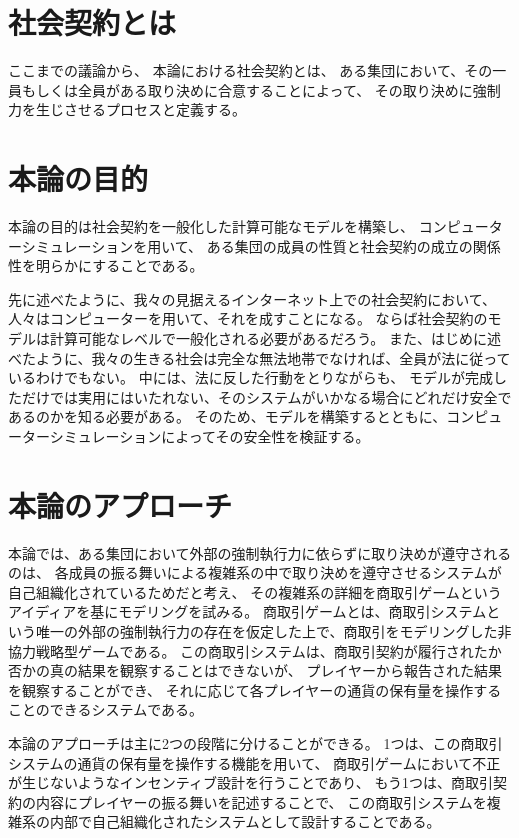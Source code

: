   \section{社会契約とは}
  ここまでの議論から、
  本論における社会契約とは、
  ある集団において、その一員もしくは全員がある取り決めに合意することによって、
  その取り決めに強制力を生じさせるプロセスと定義する。


  \section{本論の目的}
  本論の目的は社会契約を一般化した計算可能なモデルを構築し、
  コンピューターシミュレーションを用いて、
  ある集団の成員の性質と社会契約の成立の関係性を明らかにすることである。

  先に述べたように、我々の見据えるインターネット上での社会契約において、
  人々はコンピューターを用いて、それを成すことになる。
  ならば社会契約のモデルは計算可能なレベルで一般化される必要があるだろう。
  また、はじめに述べたように、我々の生きる社会は完全な無法地帯でなければ、全員が法に従っているわけでもない。
  中には、法に反した行動をとりながらも、
  モデルが完成しただけでは実用にはいたれない、そのシステムがいかなる場合にどれだけ安全であるのかを知る必要がある。
  そのため、モデルを構築するとともに、コンピューターシミュレーションによってその安全性を検証する。

  \section{本論のアプローチ}
  本論では、ある集団において外部の強制執行力に依らずに取り決めが遵守されるのは、
  各成員の振る舞いによる複雑系の中で取り決めを遵守させるシステムが自己組織化されているためだと考え、
  その複雑系の詳細を商取引ゲームというアイディアを基にモデリングを試みる。
  商取引ゲームとは、商取引システムという唯一の外部の強制執行力の存在を仮定した上で、商取引をモデリングした非協力戦略型ゲームである。
  この商取引システムは、商取引契約が履行されたか否かの真の結果を観察することはできないが、
  プレイヤーから報告された結果を観察することができ、
  それに応じて各プレイヤーの通貨の保有量を操作することのできるシステムである。
  
  本論のアプローチは主に2つの段階に分けることができる。
  1つは、この商取引システムの通貨の保有量を操作する機能を用いて、
  商取引ゲームにおいて不正が生じないようなインセンティブ設計を行うことであり、
  もう1つは、商取引契約の内容にプレイヤーの振る舞いを記述することで、
  この商取引システムを複雑系の内部で自己組織化されたシステムとして設計することである。

